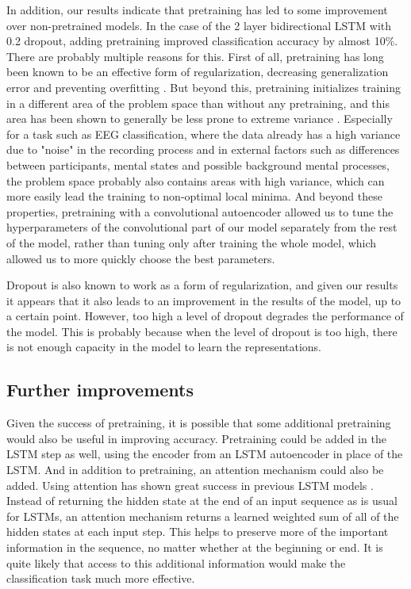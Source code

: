 \documentclass{article}
\begin{document}
In addition, our results indicate that pretraining has led to some improvement over non-pretrained models. In the case of the 2 layer bidirectional LSTM with 0.2 dropout, adding pretraining improved classification accuracy by almost 10\%. There are probably multiple reasons for this. First of all, pretraining has long been known to be an effective form of regularization, decreasing generalization error and preventing overfitting \cite{pretraining}. But beyond this, pretraining initializes training in a different area of the problem space than without any pretraining, and this area has been shown to generally be less prone to extreme variance \cite{pretraining}. Especially for a task such as EEG classification, where the data already has a high variance due to "noise" in the recording process and in external factors such as differences between participants, mental states and possible background mental processes, the problem space probably also contains areas with high variance, which can more easily lead the training to non-optimal local minima. And beyond these properties, pretraining with a convolutional autoencoder allowed us to tune the hyperparameters of the convolutional part of our model separately from the rest of the model, rather than tuning only after training the whole model, which allowed us to more quickly choose the best parameters. 

Dropout is also known to work as a form of regularization, and given our results it appears that it also leads to an improvement in the results of the model, up to a certain point. However, too high a level of dropout degrades the performance of the model. This is probably because when the level of dropout is too high, there is not enough capacity in the model to learn the representations. 
\subsection{Further improvements}
Given the success of pretraining, it is possible that some additional pretraining would also be useful in improving accuracy. Pretraining could be added in the LSTM step as well, using the encoder from an LSTM autoencoder in place of the LSTM. And in addition to pretraining, an attention mechanism could also be added. Using attention has shown great success in previous LSTM models \cite{attention}. Instead of returning the hidden state at the end of an input sequence as is usual for LSTMs, an attention mechanism returns a learned weighted sum of all of the hidden states at each input step. This helps to preserve more of the important information in the sequence, no matter whether at the beginning or end. It is quite likely that access to this additional information would make the classification task much more effective. 
\end{document}
